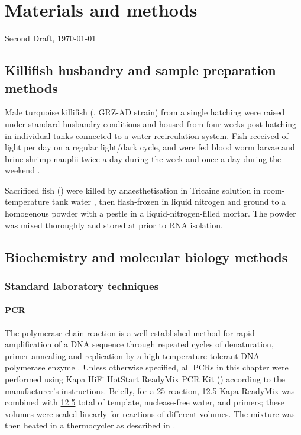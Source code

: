 \chapter{Materials and methods}  
\onehalfspacing

\ifdefineChapter
	{\LARGE Second Draft, \today}
\fi

\pagebreak

\section{Killifish husbandry and sample preparation methods}
\label{sec:methods_husbandry}

Male turquoise killifish (\nfu, GRZ-AD strain) from a single hatching were raised under standard husbandry conditions \parencite{dodzian2018husbandry} and housed from four weeks post-hatching in individual  tanks connected to a water recirculation system. Fish received  of light per day on a regular light/dark cycle, and were fed blood
worm larvae and brine shrimp nauplii twice a day during the week and once a day during the weekend \parencite{dodzian2018husbandry,smith2017microbiota}.

Sacrificed fish () were killed by anaesthetisation in  Tricaine solution in room-temperature tank water \parencite{carter2011tricaine}, then flash-frozen in liquid nitrogen and ground to a homogenous powder with a pestle in a liquid-nitrogen-filled mortar. The powder was mixed thoroughly and stored at  prior to RNA isolation.

\section{Biochemistry and molecular biology methods}

\subsection{Standard laboratory techniques}

\subsubsection{PCR}
\label{sec:methods_molec_standard_pcr}

The polymerase chain reaction is a well-established method for rapid amplification of a DNA sequence through repeated cycles of denaturation, primer-annealing and replication by a high-temperature-tolerant DNA polymerase enzyme \parencite{paul2010hotstartpcr}. Unless otherwise specified, all PCRs in this chapter were performed using  Kapa HiFi HotStart ReadyMix PCR Kit () according to the manufacturer's instructions. Briefly, for a \ul{25} reaction, \ul{12.5} Kapa ReadyMix was combined with \ul{12.5} total of template, nuclease-free water, and primers; these volumes were scaled linearly for reactions of different volumes. The mixture was then heated in a thermocycler as described in .

